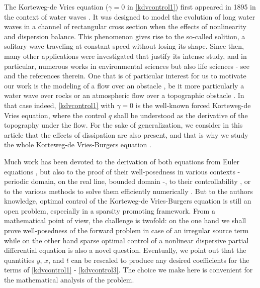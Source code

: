 The Korteweg-de Vries equation ($\gamma=0$ in \eqref{kdvcontrol1}) first appeared in 1895 in the context of water waves \cite{korteweg1895xli}. It was designed to model the evolution of long water waves in a channel of rectangular cross section when the effects of nonlinearity and dispersion balance. This phenomenon gives rise to the so-called solition, a solitary wave traveling at constant speed without losing its shape. Since then, many other applications were investigated that justify its intense study, and in particular, numerous works in environmental sciences but also life sciences - see \cite{dauxois2006physics,whitham2011linear,Crepeau2007594,yomosa1987} and the references therein. One that is of particular interest for us to motivate our work is the modeling of a flow over an obstacle \cite{milewski2004forced,shen1992forced,shen1996accuracy}, be it more particularly a water wave over rocks or an atmospheric flow over a topographic obstacle \cite{baines1997topographic}. In that case indeed, \eqref{kdvcontrol1} with $\gamma=0$ is the well-known forced Korteweg-de Vries equation, where the control $q$ shall be understood as the derivative of the topography under the flow. For the sake of generalization, we consider in this article that the effects of dissipation are also present, and that is why we study the whole Korteweg-de Vries-Burgers equation \cite{su2003korteweg}.

Much work has been devoted to the derivation of both equations from Euler equations \cite{shen1992forced,constantin2008,su2003korteweg}, but also to the proof of their well-posedness in various contexts \cite{miura1976korteweg,kenig1993,bourgain1997periodic} - periodic domain, on the real line, bounded domain -, to their controllability \cite{rosier1997exact,glass2008some,coron2003exact,chapouly2009global}, or to the various methods to solve them efficiently numerically \cite{trefethen2000spectral,shen2003new,ma2000legendre}. But to the authors knowledge, optimal control of the Korteweg-de Vries-Burgers equation is still an open problem, especially in a sparsity promoting framework. From a mathematical point of view, the challenge is twofold: on the one hand we shall prove well-posedness of the forward problem in case of an irregular source term while on the other hand sparse optimal control of a nonlinear dispersive partial differential equation is also a novel question. Eventually, we point out that the quantities $y$, $x$, and $t$ can be rescaled to produce any desired coefficients for the terms of \eqref{kdvcontrol1} - \eqref{kdvcontrol3}. The choice we make here is convenient for the mathematical analysis of the problem.

